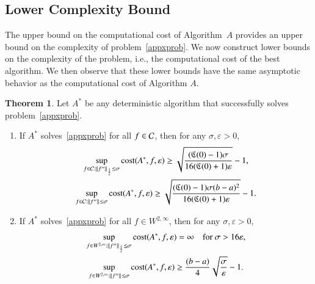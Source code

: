 \documentclass[review]{elsarticle}
\newcommand{\abstol}{\varepsilon}
\theoremstyle{definition}
\renewcommand{\cw}{W}
\newtheorem{theorem}{Theorem}
\begin{document}
\subsection{Lower Complexity Bound} \label{subsec:appxcomp}

The upper bound on the computational cost of Algorithm~$A$ provides an upper
bound on the complexity of problem~\eqref{appxprob}. We now construct lower
bounds on the complexity of the problem, i.e., the computational cost of the
best algorithm. We then observe that these lower bounds have the same asymptotic
behavior as the computational cost of Algorithm $A$.

\begin{theorem}
	Let $A^*$ be any deterministic algorithm that successfully solves problem~\eqref{appxprob}.
	
	\begin{enumerate}
		\renewcommand{\labelenumi}{\roman{enumi}.}
		\item  If $A^*$ solves~\eqref{appxprob} for all $f \in \mathcal{C}$, then for any $\sigma, \abstol >0$,
		\begin{subequations} \label{lowbdC}
		\begin{gather}
		\sup_{f \in \cc : \norm[\frac12]{f''} \le\sigma } \cost(A^*,f,\abstol) \ge \sqrt{\frac{(\fC(0)-1)\sigma}{16(\fC(0)+1)\abstol}} -1, \label{lowbdChalf}\\
		\sup_{f \in \cc : \norm{f''} \le\sigma } \cost(A^*,f,\abstol) \ge \sqrt{\frac{(\fC(0)-1)\sigma(b-a)^2}{16(\fC(0)+1)\abstol}} -1 \label{lowbdCinf}.
		\end{gather}
		\end{subequations}
		
		\item If $A^*$ solves~\eqref{appxprob} for all $f \in  \cw^{2,\infty}$, then for any $\sigma, \abstol >0$,
		\begin{subequations} \label{lowbdW}
		\begin{gather}
		\sup_{f \in \cw^{2,\infty} : \norm[\frac12]{f''} \le \sigma} \cost(A^*,f,\abstol) = \infty \quad \text{for } \sigma > 16 \abstol, \label{lowbdWhalf}\\
		\sup_{f \in \cw^{2,\infty} : \norm{f''} \le\sigma } \cost(A^*,f,\abstol) \ge \frac{(b-a)}{4} \sqrt{\frac{\sigma}{\abstol}} - 1.  \label{lowbdWinf}
		\end{gather}
		\end{subequations}
				
	\end{enumerate}
	\label{thm:A_cost}
\end{theorem}
\end{document}
